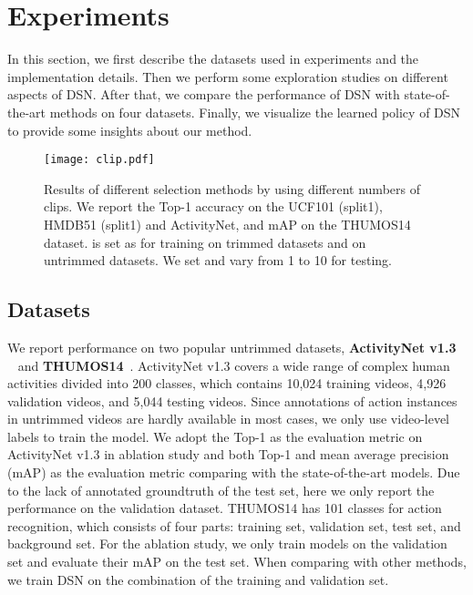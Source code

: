 \documentclass[journal]{IEEEtran}
\begin{document}
\section{Experiments}
\label{sec:exp}

In this section, we first describe the datasets used in experiments and the implementation details.
Then we perform some exploration studies on different aspects of DSN.
After that, we compare the performance of DSN with state-of-the-art methods on four datasets.
Finally, we visualize the learned policy of DSN to provide some insights about our method.



\begin{figure*}[t]
  \centering
  \texttt{[image: clip.pdf]}
  \caption{Results of different selection methods by using different numbers of clips. We report the Top-1 accuracy on the UCF101 (split1), HMDB51 (split1) and ActivityNet, and mAP on the THUMOS14 dataset.  is set as  for training on trimmed datasets and  on untrimmed datasets. We set  and vary  from 1 to 10 for testing.}
  \label{fig:clip}
\end{figure*}



\subsection{Datasets}
\label{subec:datasets}

We report performance on two popular untrimmed datasets, \textbf{ActivityNet v1.3} ~\cite{anet} and \textbf{THUMOS14}~\cite{THUMOS14}.
ActivityNet v1.3 covers a wide range of complex human activities divided into 200 classes, which contains 10,024 training videos, 4,926 validation videos, and 5,044 testing videos.
Since annotations of action instances in untrimmed videos are hardly available in most cases, we only use video-level labels to train the model.
We adopt the Top-1 as the evaluation metric on ActivityNet v1.3 in ablation study and both Top-1 and mean average precision (mAP) as the evaluation metric comparing with the state-of-the-art models.
Due to the lack of annotated groundtruth of the test set, here we only report the performance on the validation dataset.
THUMOS14 has 101 classes for action recognition, which consists of four parts: training set, validation set, test set, and background set.
For the ablation study, we only train models on the validation set and evaluate their mAP on the test set. When comparing with other methods, we train DSN on the combination of the training and validation set.
\end{document}
